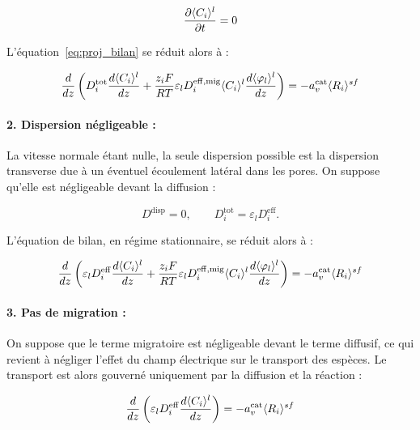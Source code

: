 \begin{equation}
\frac{\partial \langle C_i \rangle^l}{\partial t} = 0
\end{equation}

L'équation~\eqref{eq:proj_bilan} se réduit alors à :

\begin{equation}
     \frac{d}{dz}\left( D^{\mathrm{tot}}_i \frac{d\langle C_i \rangle^l}{dz}
     + \frac{z_i F}{RT}\varepsilon_l D^{\mathrm{eff,mig}}_i \langle C_i \rangle^l \frac{d\langle \varphi_l \rangle^l}{dz}
     \right)
     = -a_v^{\mathrm{cat}} \langle R_i \rangle^{sf}
\end{equation}


\paragraph{2. Dispersion négligeable :}
La vitesse normale étant nulle, la seule dispersion possible est la
dispersion transverse due à un éventuel écoulement latéral dans les pores.
On suppose qu'elle est négligeable devant la diffusion :

\begin{equation}
D^{\mathrm{disp}} = 0,
\qquad
D_i^{\mathrm{tot}} = \varepsilon_l D_i^{\mathrm{eff}} .
\end{equation}

L'équation de bilan, en régime stationnaire, se réduit alors à :

\begin{equation}
     \frac{d}{dz}\left( \varepsilon_l D^{\mathrm{eff}}_i \frac{d\langle C_i \rangle^l}{dz}
     + \frac{z_i F}{RT}\varepsilon_l D^{\mathrm{eff,mig}}_i \langle C_i \rangle^l \frac{d\langle \varphi_l \rangle^l}{dz} \right)
     = -a_v^{\mathrm{cat}} \langle R_i \rangle^{sf}
\end{equation}

\paragraph{3. Pas de migration :}
On suppose que le terme migratoire est négligeable devant le terme
diffusif, ce qui revient à négliger l'effet du champ électrique sur
le transport des espèces. Le transport est alors gouverné uniquement
par la diffusion et la réaction :

\begin{equation}
     \frac{d}{dz}\left( \varepsilon_l D^{\mathrm{eff}}_i \frac{d\langle C_i \rangle^l}{dz} \right)
     = -a_v^{\mathrm{cat}} \langle R_i \rangle^{sf}
\label{eq:diff_reaction}
\end{equation}

